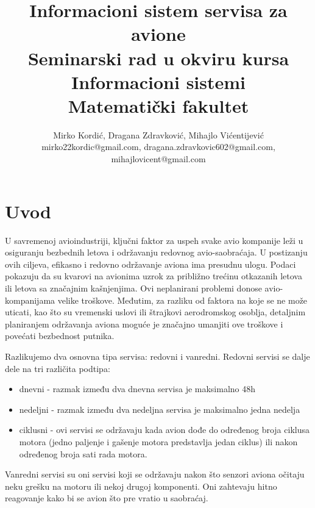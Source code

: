 \documentclass[a4paper]{article}
\begin{document}
\title{Informacioni sistem servisa za avione\\ \small{Seminarski rad u okviru kursa\\Informacioni sistemi\\ Matematički fakultet}}

\author{Mirko Kordić, Dragana Zdravković, Mihajlo Vićentijević\\ mirko22kordic@gmail.com, dragana.zdravkovic602@gmail.com, \\mihajlovicent@gmail.com}


\maketitle

\tableofcontents

\newpage

\section{Uvod}
\label{sec:uvod}
U savremenoj avioindustriji, ključni faktor za uspeh svake avio kompanije leži u osiguranju bezbednih letova i održavanju redovnog avio-saobraćaja. U postizanju ovih ciljeva, efikasno i redovno održavanje aviona ima presudnu ulogu. Podaci pokazuju da su kvarovi na avionima uzrok za približno trećinu otkazanih letova ili letova sa značajnim kašnjenjima. Ovi neplanirani problemi donose avio-kompanijama velike troškove. Međutim, za razliku od faktora na koje se ne može uticati, kao što su vremenski uslovi ili štrajkovi aerodromskog osoblja, detaljnim planiranjem održavanja aviona moguće je značajno umanjiti ove troškove i povećati bezbednost putnika.

Razlikujemo dva osnovna tipa servisa: redovni i vanredni. Redovni servisi se dalje dele na tri različita podtipa:
\begin{itemize}
    \item dnevni - razmak između dva dnevna servisa je maksimalno 48h
    \item nedeljni - razmak između dva nedeljna servisa je maksimalno jedna nedelja
    \item ciklusni - ovi servisi se održavaju kada avion dođe do određenog broja ciklusa motora (jedno paljenje i gašenje motora predstavlja jedan ciklus) ili nakon određenog broja sati rada motora.
\end{itemize}

Vanredni servisi su oni servisi koji se održavaju nakon što senzori aviona očitaju neku grešku na motoru ili nekoj drugoj komponenti. Oni zahtevaju hitno reagovanje kako bi se avion što pre vratio u saobraćaj. 
\end{document}
